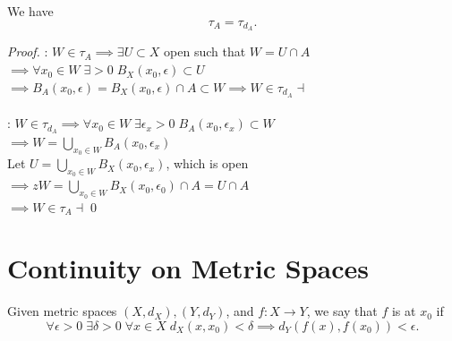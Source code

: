 \documentclass[notoc,notitlepage]{tufte-book}
\begin{document}
\begin{thm}\label{thm:the_metric_topology_of_a_subset_is_its_induced_topology}
  We have
  \begin{equation*}
    \tau_A = \tau_{d_A}.
  \end{equation*}
\end{thm}

\begin{proof}
  \hlbnotea{$\subseteq$} : $W \in \tau_A \implies \exists U \subset X$ open such that $W = U \cap A$ \\
  $\implies \forall x_0 \in W \; \exists > 0 \; B_X(x_0, \epsilon) \subset U$ \\
  $\implies B_A(x_0, \epsilon) = B_X(x_0, \epsilon) \cap A \subset W \implies W \in \tau_{d_A} \dashv$ \\
  $ $ \\
  \noindent\hlbnotea{$\supseteq$} : $W \in \tau_{d_A} \implies \forall x_0 \in W \; \exists \epsilon_x > 0 \; B_A(x_0, \epsilon_x) \subset W$ \\
  $\implies W = \bigcup_{x_0 \in W} B_A(x_0, \epsilon_x)$\\
  Let $U = \bigcup_{x_0 \in W} B_X(x_0, \epsilon_x)$, which is open \\
  $\implies zW = \bigcup_{x_0 \in W} B_X(x_0, \epsilon_0) \cap A = U \cap A$ \\
  $\implies W \in \tau_A \dashv$\qed\
\end{proof}


\section{Continuity on Metric Spaces}%
\label{sec:continuity_on_metric_spaces}

\begin{defn}[Continuity]\label{defn:continuity}
  Given metric spaces $(X, d_X), (Y, d_Y)$, and $f : X \to Y$, we say that $f$ is  at $x_0$ if
  \begin{equation*}
    \forall \epsilon > 0 \; \exists \delta > 0 \; \forall x \in X \; d_X(x, x_0) < \delta \implies d_Y( f(x), f(x_0) ) < \epsilon.
  \end{equation*}
\end{defn}
\end{document}

